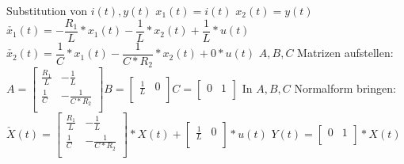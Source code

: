 \documentclass[11pt, a4paper, twoside]{article}   	%
\begin{document}
\newline
\newline
\newline
\newline
Substitution von $i(t), y(t)$
\newline
$x_{1}(t) = i(t)$
\newline
\newline
$x_{2}(t) = y(t)$
\newline
\newline
$\check{x_{1}}(t) = - \dfrac{R_{1}}{L} * x_{1}(t) - \dfrac{1}{L} * x_{2}(t) + \dfrac{1}{L} * u(t)$
\newline
$\check{x_{2}}(t) = \dfrac{1}{C} * x_{1}(t) - \dfrac{1}{C * R_{2}} * x_{2}(t) + 0 * u(t)$
\newline
\newline
\newline
\newline
$A, B, C$ Matrizen aufstellen:
\newline
\newline
$
A = \begin{bmatrix}
	\frac{R_{1}}{L} & -\frac{1}{L} \\[0.3em]
    \frac{1}{C}     & -\frac{1}{C*R_{2}} \\[0.3em]
\end{bmatrix}
B =  \begin{bmatrix}
	\frac{1}{L} & 0 \\[0.3em]
\end{bmatrix}
C =  \begin{bmatrix}
	0 & 1 \\[0.3em]
\end{bmatrix}
$
\newpage
\parindent0pt In $A, B, C$ Normalform bringen:
\newline
\newline
$
\check{X}(t) = 
\begin{bmatrix}
	\frac{R_{1}}{L} & -\frac{1}{L} \\[0.3em]
    \frac{1}{C}     & -\frac{1}{C*R_{2}} \\[0.3em]
\end{bmatrix}
 * X(t) + 
\begin{bmatrix}
	\frac{1}{L} & 0 \\[0.3em]
\end{bmatrix}
 * u(t)
$
\newline
\newline
\newline
$
Y(t) = 
\begin{bmatrix}
	0 & 1 \\[0.3em]
\end{bmatrix}
 *X(t)
$
\newpage
\end{document}
